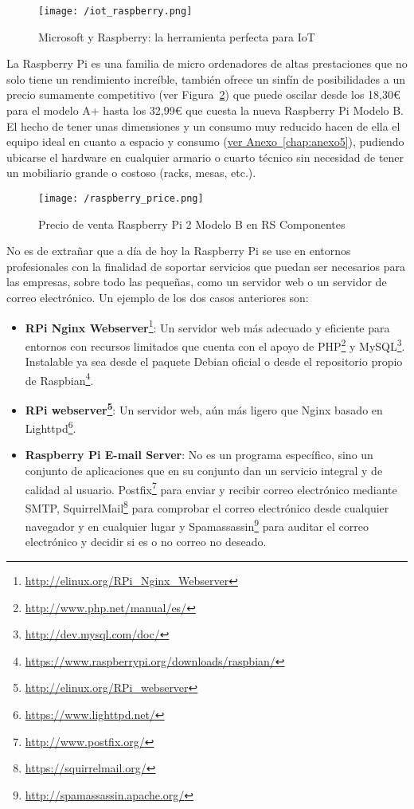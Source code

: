 \begin{figure}[!h]
\centering
\texttt{[image: /iot\_raspberry.png]}
\caption{Microsoft y Raspberry: la herramienta perfecta para IoT \cite{RaspberryPiIoT}}
\label{fig:iot_raspeberry}
\end{figure}

La  Raspberry  Pi es una familia de micro  ordenadores  de  altas prestaciones  que  no solo  tiene  un  rendimiento increíble, también ofrece un sinfín de posibilidades a un precio sumamente competitivo (ver Figura~\ref{fig:raspeberry_price}) que puede oscilar desde los 18,30\euro{}  para el modelo A+ hasta los 32,99\euro{}  que cuesta la nueva Raspberry Pi  Modelo B. El hecho de  tener unas dimensiones  y un  consumo muy reducido  hacen de ella el equipo  ideal en cuanto a espacio y consumo (\hyperref[chap:anexo5]{ver Anexo~\ref{chap:anexo5}}), pudiendo  ubicarse el hardware  en cualquier armario o cuarto técnico sin necesidad de tener un mobiliario grande o costoso (racks,  mesas, etc.). 

\begin{figure}[!h]
\centering
\texttt{[image: /raspberry\_price.png]}
\caption{Precio de venta Raspberry Pi 2 Modelo B en RS Componentes~\cite{RSCompPi2}}
\label{fig:raspeberry_price}
\end{figure}

No es de extrañar que a día de hoy la Raspberry Pi se use en entornos profesionales con la finalidad de soportar servicios que puedan ser necesarios para las empresas, sobre todo las pequeñas, como un servidor web o un servidor de correo electrónico. Un ejemplo de los dos casos anteriores son:

\begin{itemize}
\item \textbf{RPi Nginx Webserver}\footnote{\url{http://elinux.org/RPi_Nginx_Webserver}}: Un servidor web más adecuado y eficiente para entornos con recursos limitados que cuenta con el apoyo de PHP\footnote{\url{http://www.php.net/manual/es/}} y MySQL\footnote{\url{http://dev.mysql.com/doc/}}. Instalable ya sea desde el paquete Debian oficial o desde el repositorio propio de Raspbian\footnote{\url{https://www.raspberrypi.org/downloads/raspbian/}}.
\item \textbf{RPi webserver\footnote{\url{http://elinux.org/RPi_webserver}}}: Un servidor web, aún más ligero que Nginx basado en Lighttpd\footnote{\url{https://www.lighttpd.net/}}.

\item \textbf{Raspberry Pi E-mail Server}: No es un programa específico, sino un conjunto de aplicaciones que en su conjunto dan un servicio integral y de calidad al usuario. Postfix\footnote{\url{http://www.postfix.org/}} para enviar y recibir correo electrónico mediante \acf{SMTP}, SquirrelMail\footnote{\url{https://squirrelmail.org/}} para comprobar el correo electrónico desde cualquier navegador y en cualquier lugar y Spamassassin\footnote{\url{http://spamassassin.apache.org/}} para auditar el correo electrónico y decidir si  es o no correo no deseado.
\end{itemize}

